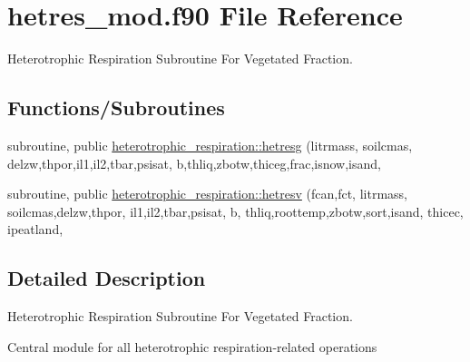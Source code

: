 \hypertarget{hetres__mod_8f90}{}\section{hetres\+\_\+mod.\+f90 File Reference}
\label{hetres__mod_8f90}


Heterotrophic Respiration Subroutine For Vegetated Fraction.  


\subsection*{Functions/\+Subroutines}
{\bf }\par
\begin{DoxyCompactItemize}
\item 
subroutine, public \hyperlink{group__hetresg_gaf35383e36392dff7ca33ff9022cb70c0}{heterotrophic\+\_\+respiration\+::hetresg} (litrmass, soilcmas, delzw,thpor,il1,il2,tbar,psisat, b,thliq,zbotw,thiceg,frac,isnow,isand,
\end{DoxyCompactItemize}

{\bf }\par
\begin{DoxyCompactItemize}
\item 
subroutine, public \hyperlink{group__hetresv_gabafd1229b9f5bc311e761b6ce707025a}{heterotrophic\+\_\+respiration\+::hetresv} (fcan,fct, litrmass, soilcmas,delzw,thpor, il1,il2,tbar,psisat, b, thliq,roottemp,zbotw,sort,isand, thicec, ipeatland,
\end{DoxyCompactItemize}



\subsection{Detailed Description}
Heterotrophic Respiration Subroutine For Vegetated Fraction. 

Central module for all heterotrophic respiration-\/related operations 